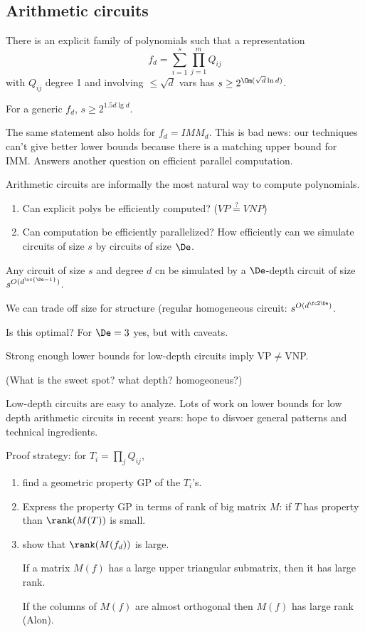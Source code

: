 \subsection{Arithmetic circuits}

\begin{thm}
There is an explicit family of polynomials such that a representation
\[
f_d=\sum_{i=1}^s \prod_{j=1}^m Q_{ij}
\]
with $Q_{ij}$ degree 1 and involving $\le \sqrt d$ vars has $s\ge 2^{\Om(\sqrt d\ln d)}$.
\end{thm}
For a generic $f_d$, $s\ge 2^{1.5d\lg d}$.

The same statement also holds for $f_d=IMM_d$. 
This is bad news: our techniques can't give better lower bounds because there is a matching upper bound for IMM.
Answers another question on efficient parallel computation.

Arithmetic circuits are informally the most natural way to compute polynomials.

\begin{enumerate}
\item
Can explicit polys be efficiently computed? 
($VP\stackrel?= VNP$)
\item
Can computation be efficiently parallelized?
How efficiently can we simulate circuits of size $s$ by circuits of size $\De$.
\end{enumerate}

\begin{thm}
Any circuit of size $s$ and degree $d$ cn be simulated by a $\De$-depth circuit of size $s^{O(d^{\rc{\De-1}})}$.
\end{thm}
We can trade off size for structure (regular homogeneous circuit: $s^{O(d^{\fc 2{\De}})}$.

Is this optimal? For $\De=3$ yes, but with caveats. %

Strong enough lower bounds for low-depth circuits imply VP$\ne$VNP. 

(What is the sweet spot? what depth? homogeoneus?)

Low-depth circuits are easy to analyze. Lots of work on lower bounds for low depth arithmetic circuits in recent years: hope to disvoer general patterns and technical ingredients.

Proof strategy: for $T_i=\prod_jQ_{ij}$,
\begin{enumerate}
\item
find a geometric property GP of the $T_i$'s. 
\item Express the property GP in terms of rank of big matrix $M$: if $T$ has property than $\rank(M(T))$ is small.
\item show that $\rank(M(f_d))$ is large.

If a matrix $M(f)$ has a large upper triangular submatrix, then it has large rank.

If the columns of $M(f)$ are almost orthogonal then $M(f)$ has large rank (Alon).
\end{enumerate}

